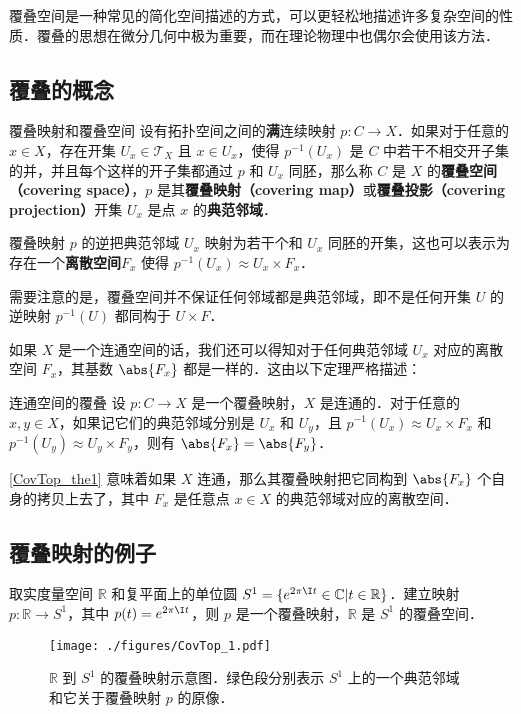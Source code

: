 

覆叠空间是一种常见的简化空间描述的方式，可以更轻松地描述许多复杂空间的性质．覆叠的思想在微分几何中极为重要，而在理论物理中也偶尔会使用该方法．

\subsection{覆叠的概念}
\begin{definition}{覆叠映射和覆叠空间}\label{CovTop_def1}
设有拓扑空间之间的\textbf{满}连续映射 $p:C\rightarrow X$．如果对于任意的 $x\in X$，存在开集 $U_x\in\mathcal{T}_X$ 且 $x\in U_x$，使得 $p^{-1}(U_x)$ 是 $C$ 中若干不相交开子集的并，并且每个这样的开子集都通过 $p$ 和 $U_x$ 同胚，那么称 $C$ 是 $X$ 的\textbf{覆叠空间（covering space）}，$p$ 是其\textbf{覆叠映射（covering map）}或\textbf{覆叠投影（covering projection）}开集 $U_x$ 是点 $x$ 的\textbf{典范邻域}．
\end{definition} 

覆叠映射 $p$ 的逆把典范邻域 $U_x$ 映射为若干个和 $U_x$ 同胚的开集，这也可以表示为存在一个\textbf{离散空间}$F_x$ 使得 $p^{-1}(U_x)\approx U_x\times F_x$．

需要注意的是，覆叠空间并不保证任何邻域都是典范邻域，即不是任何开集 $U$ 的逆映射 $p^{-1}(U)$ 都同构于 $U\times F$．

如果 $X$ 是一个连通空间的话，我们还可以得知对于任何典范邻域 $U_x$ 对应的离散空间 $F_x$，其基数 $\abs{F_x}$ 都是一样的．这由以下定理严格描述：

\begin{theorem}{连通空间的覆叠}\label{CovTop_the1}
设 $p:C\rightarrow X$ 是一个覆叠映射，$X$ 是连通的．对于任意的 $x, y\in X$，如果记它们的典范邻域分别是 $U_x$ 和 $U_y$，且 $p^{-1}(U_x)\approx U_x\times F_x$ 和 $p^{-1}(U_y)\approx U_y\times F_y$，则有 $\abs{F_x}=\abs{F_y}$．
\end{theorem}

\autoref{CovTop_the1} 意味着如果 $X$ 连通，那么其覆叠映射把它同构到 $\abs{F_x}$ 个自身的拷贝上去了，其中 $F_x$ 是任意点 $x\in X$ 的典范邻域对应的离散空间．

\subsection{覆叠映射的例子}

\begin{example}{}
取实度量空间 $\mathbb{R}$ 和复平面上的单位圆 $S^1=\{e^{2\pi\I t}\in\mathbb{C}|t\in\mathbb{R}\}$．建立映射 $p:\mathbb{R}\rightarrow S^1$，其中 $p(t)=e^{2\pi\I t}$，则 $p$ 是一个覆叠映射，$\mathbb{R}$ 是 $S^1$ 的覆叠空间．

\begin{figure}[ht]
\centering
\texttt{[image: ./figures/CovTop\_1.pdf]}
\caption{$\mathbb{R}$ 到 $S^1$ 的覆叠映射示意图．绿色段分别表示 $S^1$ 上的一个典范邻域和它关于覆叠映射 $p$ 的原像．} \label{CovTop_fig1}
\end{figure}
\end{example}

